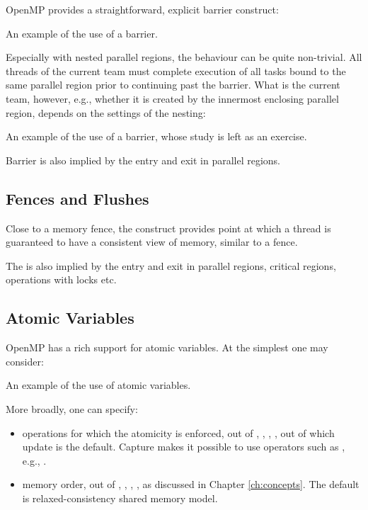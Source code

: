 OpenMP provides a straightforward, explicit barrier construct:

\raggedbottom
\begin{codebox}[]{\href{https://godbolt.org/z/qK53jYonK}{\ExternalLink}}
\footnotesize An example of the use of a barrier.
\tcblower
{}
\end{codebox}

Especially with nested parallel regions, the behaviour can be quite non-trivial.
All threads of the current team must complete execution of all tasks bound to the same parallel region prior to continuing past the barrier. What is the current team, however, e.g., whether it is created by the innermost enclosing parallel region,
depends on the settings of the nesting:

\raggedbottom
\begin{codebox}[]{\href{https://godbolt.org/z/eb7n975ea}{\ExternalLink}}
\footnotesize An example of the use of a barrier, whose study is left as an exercise.
\tcblower
{}
\end{codebox}

Barrier is also implied by the entry and exit in parallel regions.

\subsection{Fences and Flushes}

Close to a memory fence, the  construct provides point at which a thread is guaranteed to
have a consistent view of memory, similar to a fence. 

The  is also implied by the entry and exit in parallel regions, critical regions, operations with locks etc. 

\subsection{Atomic Variables}

OpenMP has a rich support for atomic variables. 
At the simplest one may consider:

\raggedbottom
\begin{codebox}[]{\href{https://godbolt.org/z/baqqEMKEe}{\ExternalLink}}
\footnotesize An example of the use of atomic variables.
\tcblower
{}
\end{codebox}

More broadly, one can specify:
\begin{itemize}
\item operations for which the atomicity is enforced, out of ,  , , , out of which update is the default. Capture makes it possible to use operators such as \cpp{+=}, e.g., .
\item memory order, out of , , ,  ,   as discussed in Chapter \ref{ch:concepts}. The default is relaxed-consistency shared memory model.
\end{itemize}

